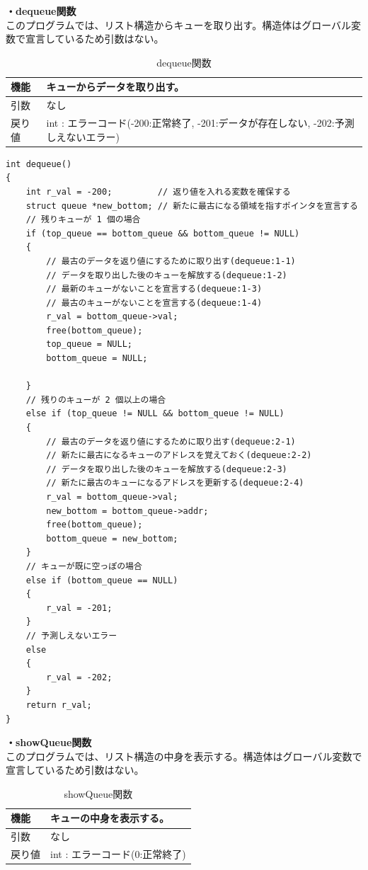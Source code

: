 \documentclass[dvipdfmx]{jsarticle}
\begin{document}
\textbf{・dequeue関数}\\
このプログラムでは、リスト構造からキューを取り出す。構造体はグローバル変数で宣言しているため引数はない。
\begin{table}[ht]
  \centering
  \caption{dequeue関数}
  \begin{tabular}{|p{5cm}|p{10cm}|}
    \hline
    機能  & キューからデータを取り出す。                                      \\
    \hline
    引数  & なし \\
    \hline
    戻り値 & int : エラーコード(-200:正常終了, -201:データが存在しない, -202:予測しえないエラー) \\
    \hline
  \end{tabular}
  \label{tab:dequeue_func_3}
\end{table}
\begin{lstlisting}[caption={dequeue関数}, label={lst:dequeue_func_3}]
int dequeue()
{
    int r_val = -200;         // 返り値を入れる変数を確保する
    struct queue *new_bottom; // 新たに最古になる領域を指すポインタを宣言する
    // 残りキューが 1 個の場合
    if (top_queue == bottom_queue && bottom_queue != NULL)
    {
        // 最古のデータを返り値にするために取り出す(dequeue:1-1)
        // データを取り出した後のキューを解放する(dequeue:1-2)
        // 最新のキューがないことを宣言する(dequeue:1-3)
        // 最古のキューがないことを宣言する(dequeue:1-4)
        r_val = bottom_queue->val;
        free(bottom_queue);
        top_queue = NULL;
        bottom_queue = NULL;
        
    }
    // 残りのキューが 2 個以上の場合
    else if (top_queue != NULL && bottom_queue != NULL)
    {
        // 最古のデータを返り値にするために取り出す(dequeue:2-1)
        // 新たに最古になるキューのアドレスを覚えておく(dequeue:2-2)
        // データを取り出した後のキューを解放する(dequeue:2-3)
        // 新たに最古のキューになるアドレスを更新する(dequeue:2-4)
        r_val = bottom_queue->val;
        new_bottom = bottom_queue->addr;
        free(bottom_queue);
        bottom_queue = new_bottom;
    }
    // キューが既に空っぽの場合
    else if (bottom_queue == NULL)
    {
        r_val = -201;
    }
    // 予測しえないエラー
    else
    {
        r_val = -202;
    }
    return r_val;
}
\end{lstlisting}
\textbf{・showQueue関数}\\
このプログラムでは、リスト構造の中身を表示する。構造体はグローバル変数で宣言しているため引数はない。
\begin{table}[ht]
  \centering
  \caption{showQueue関数}
  \begin{tabular}{|p{5cm}|p{10cm}|}
    \hline
    機能  & キューの中身を表示する。                                      \\
    \hline
    引数  & なし \\
    \hline
    戻り値 & int : エラーコード(0:正常終了) \\
    \hline
  \end{tabular}
  \label{tab:showQueue_func_3}
\end{table}
\end{document}
